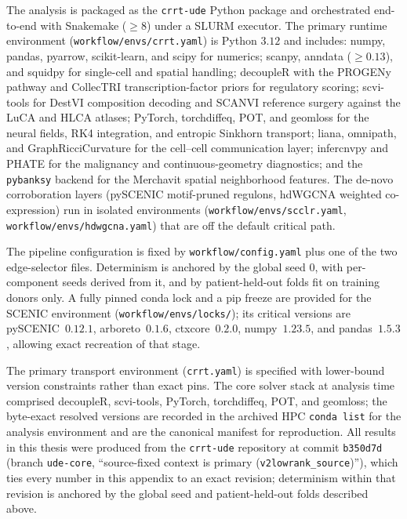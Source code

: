 The analysis is packaged as the \texttt{crrt-ude} Python package and orchestrated end-to-end with
Snakemake ($\geq 8$) under a SLURM executor. The primary runtime environment
(\texttt{workflow/envs/crrt.yaml}) is Python $3.12$ and includes: numpy, pandas, pyarrow,
scikit-learn, and scipy for numerics; scanpy, anndata ($\geq 0.13$), and squidpy for single-cell and
spatial handling; decoupleR with the PROGENy pathway and CollecTRI transcription-factor priors for
regulatory scoring; scvi-tools for DestVI composition decoding and SCANVI reference surgery against
the LuCA and HLCA atlases; PyTorch, torchdiffeq, POT, and geomloss for the neural fields, RK4
integration, and entropic Sinkhorn transport; liana, omnipath, and GraphRicciCurvature for the
cell--cell communication layer; infercnvpy and PHATE for the malignancy and continuous-geometry
diagnostics; and the \texttt{pybanksy} backend for the Merchavit spatial neighborhood features. The
de-novo corroboration layers (pySCENIC motif-pruned regulons, hdWGCNA weighted co-expression) run in
isolated environments (\texttt{workflow/envs/scclr.yaml}, \texttt{workflow/envs/hdwgcna.yaml}) that
are off the default critical path.

The pipeline configuration is fixed by \texttt{workflow/config.yaml} plus one of the two edge-selector
files. Determinism is anchored by the global seed $0$, with per-component seeds derived from it, and
by patient-held-out folds fit on training donors only. A fully pinned conda lock and a pip freeze are
provided for the SCENIC environment (\texttt{workflow/envs/locks/}); its critical versions are
pySCENIC~$0.12.1$, arboreto~$0.1.6$, ctxcore~$0.2.0$, numpy~$1.23.5$, and pandas~$1.5.3$, allowing exact
recreation of that stage.

The primary transport environment (\texttt{crrt.yaml}) is specified with lower-bound version
constraints rather than exact pins. The core solver stack at analysis time comprised decoupleR,
scvi-tools, PyTorch, torchdiffeq, POT, and geomloss; the byte-exact resolved versions are recorded in
the archived HPC \texttt{conda list} for the analysis environment and are the canonical manifest for
reproduction. All results in this thesis were produced from the \texttt{crrt-ude} repository at commit
\texttt{b350d7d} (branch \texttt{ude-core}, ``source-fixed context is primary
(\texttt{v2lowrank\_source})''), which ties every number in this appendix to an exact revision;
determinism within that revision is anchored by the global seed and patient-held-out folds described
above.



